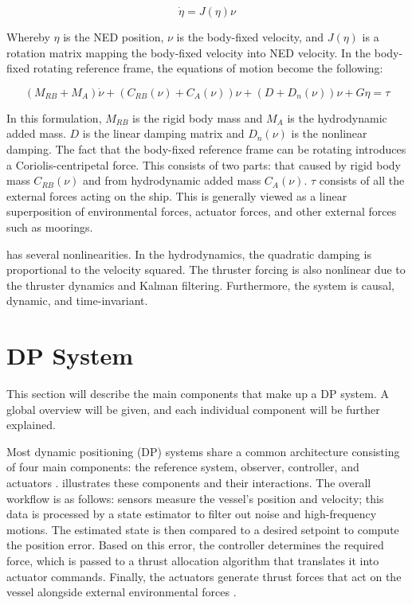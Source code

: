 \begin{equation}
    \label{eq:ned_body_transform}
    \dot{\eta} = J(\eta)\nu
\end{equation}


Whereby \(\eta\) is the NED position, \(\nu\) is the body-fixed velocity, and \(J(\eta)\) is a rotation matrix mapping the
body-fixed velocity into NED velocity. In the body-fixed rotating reference frame, the equations of motion become the following:

\begin{equation}
    \label{eq:general_eq_motion}
    (M_{RB} + M_A) \dot{\nu} + (C_{RB}(\nu) + C_A(\nu))\nu + (D + D_n(\nu))\nu + G\eta = \tau
\end{equation}

In this formulation, \(M_{RB}\) is the rigid body mass and \(M_A\) is the hydrodynamic added mass. \(D\) is the linear
damping matrix and \(D_n(\nu)\) is the nonlinear damping. The fact that the body-fixed reference frame can be rotating
introduces a Coriolis-centripetal force. This consists of two parts: that caused by rigid body mass \(C_{RB}(\nu)\)
and from hydrodynamic added mass \(C_A(\nu)\). \(\tau\) consists of all the external forces acting on the ship. This is
generally viewed as a linear superposition of environmental forces, actuator forces, and other external forces such as
moorings.

 has several nonlinearities. In the hydrodynamics, the quadratic damping is proportional to
the velocity squared. The thruster forcing is also nonlinear due to the thruster dynamics and Kalman filtering.
Furthermore, the system is causal, dynamic, and time-invariant.

\section{DP System}
\label{sec:dp_system}

This section will describe the main components that make up a DP system. A global overview will be given, and each
individual component will be further explained.

Most dynamic positioning (DP) systems share a common architecture consisting of four main components: the reference
system, observer, controller, and actuators \parencite{witOptimalThrustAllocation2009}. 
illustrates these components and their interactions. The overall workflow is as follows: sensors measure the vessel's
position and velocity; this data is processed by a state estimator to filter out noise and high-frequency motions.
The estimated state is then compared to a desired setpoint to compute the position error. Based on this error, the
controller determines the required force, which is passed to a thrust allocation algorithm that translates it into
actuator commands. Finally, the actuators generate thrust forces that act on the vessel alongside external environmental
forces \parencite{cadetIntroductionKalmanFilter2003}. 

